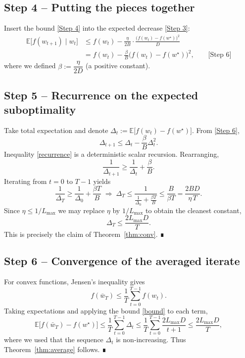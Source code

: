 \documentclass{article}
\newcommand{\E}{\mathbb{E}}
\begin{document}
\subsection*{Step 4 – Putting the pieces together}
Insert the bound \eqref{Step 4} into the expected decrease \eqref{Step 3}:
\[
\begin{aligned}
\E\!\bigl[f(w_{t+1})\mid w_{t}\bigr]
&\le f(w_{t})-\frac{\eta}{2B}
\cdot\frac{\bigl(f(w_{t})-f(w^{\star})\bigr)^{2}}{D}\\
&= f(w_{t})-\frac{\beta}{B}\bigl(f(w_{t})-f(w^{\star})\bigr)^{2},
\qquad\text{[Step 6]}
\end{aligned}
\]
where we defined $\beta:=\dfrac{\eta}{2D}$ (a positive constant).

\subsection*{Step 5 – Recurrence on the expected suboptimality}
Take total expectation and denote $\Delta_{t}:=\E\bigl[f(w_{t})-f(w^{\star})\bigr]$.
From \eqref{Step 6},
\[
\Delta_{t+1}\le \Delta_{t}-\frac{\beta}{B}\Delta_{t}^{2}.
\tag{1}
\label{recurrence}
\]
Inequality \eqref{recurrence} is a deterministic scalar recursion.
Rearranging,
\[
\frac{1}{\Delta_{t+1}} \ge \frac{1}{\Delta_{t}}+\frac{\beta}{B}.
\]
Iterating from $t=0$ to $T-1$ yields
\[
\frac{1}{\Delta_{T}} \ge \frac{1}{\Delta_{0}}+\frac{\beta T}{B}
\;\Longrightarrow\;
\Delta_{T}\le\frac{1}{\frac{1}{\Delta_{0}}+\frac{\beta T}{B}}
\le\frac{B}{\beta T}
= \frac{2BD}{\eta\,T}.
\tag{2}
\label{bound}
\]
Since $\eta\le 1/L_{\max}$ we may replace $\eta$ by $1/L_{\max}$ to obtain
the cleanest constant,
\[
\Delta_{T}\le\frac{2L_{\max}D}{T}.
\]
This is precisely the claim of Theorem~\ref{thm:conv}. ∎

\subsection*{Step 6 – Convergence of the averaged iterate}
For convex functions, Jensen’s inequality gives
\[
f(\bar w_{T})\le\frac1T\sum_{t=0}^{T-1} f(w_{t}).
\]
Taking expectations and applying the bound \eqref{bound} to each term,
\[
\E\!\bigl[f(\bar w_{T})-f(w^{\star})\bigr]
\le\frac1T\sum_{t=0}^{T-1}\Delta_{t}
\le\frac{1}{T}\sum_{t=0}^{T-1}\frac{2L_{\max}D}{t+1}
\le\frac{2L_{\max}D}{T},
\]
where we used that the sequence $\Delta_{t}$ is non‑increasing.
Thus Theorem~\ref{thm:average} follows. ∎

\end{document}
